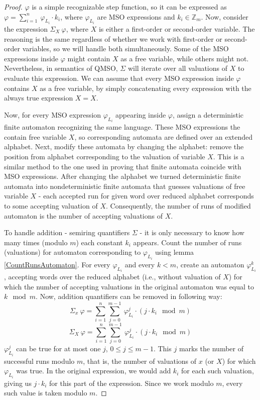 \documentclass[12pt]{article}
\theoremstyle{definition}
\begin{document}
\begin{proof}
    $\varphi$ is a simple recognizable step function, so it can be expressed as $\varphi = \sum_{i = 1}^{n} \ \varphi_{L_i} \cdot k_i$, where $\varphi_{L_i}$ are MSO expressions and $k_i \in \mathbb{Z}_m$. Now, consider the expression $\Sigma_{X} \ \varphi$, where $X$ is either a first-order or second-order variable. The reasoning is the same regardless of whether we work with first-order or second-order variables, so we will handle both simultaneously. Some of the MSO expressions inside $\varphi$ might contain $X$ as a free variable, while others might not. Nevertheless, in semantics of QMSO, $\Sigma$ will iterate over all valuations of $X$ to evaluate this expression. We can assume that every MSO expression inside $\varphi$ contains $X$ as a free variable, by simply concatenating every expression with the always true expression $X = X$.

    Now, for every MSO expression $\varphi_{L_i}$ appearing inside $\varphi$, assign a deterministic finite automaton recognizing the same language. These MSO expressions the contain free variable $X$, so corresponding automata are defined over an extended alphabet. Next, modify these automata by changing the alphabet: remove the position from alphabet corresponding to the valuation of variable $X$. This is a similar method to the one used in proving that finite automata coincide with MSO expressions. After changing the alphabet we turned deterministic finite automata into nondeterministic finite automata that guesses valuations of free variable $X$ - each accepted run for given word over reduced alphabet corresponds to some accepting valuation of $X$. Consequently, the number of runs of modified automaton is the number of accepting valuations of $X$.

    To handle addition - semiring quantifiers $\Sigma$ - it is only necessary to know how many times (modulo $m$) each constant $k_i$ appears. Count the number of runs (valuations) for automaton corresponding to $\varphi_{L_i}$ using lemma \ref{CountRunsAutomaton}. For every $\varphi_{L_i}$ and every $k < m$, create an automaton $\varphi_{L_i}^k$, accepting words over the reduced alphabet (i.e., without valuation of $X$) for which the number of accepting valuations in the original automaton was equal to $k \mod m$. Now, addition quantifiers can be removed in following way:
    $$\Sigma_x \ \varphi = \sum_{i = 1}^n \sum_{j = 0}^{m-1} \ \varphi_{L_i}^j \cdot (j \cdot k_i \mod m)$$
    $$\Sigma_X \ \varphi = \sum_{i = 1}^n \sum_{j = 0}^{m-1} \ \varphi_{L_i}^j \cdot (j \cdot k_i \mod m)$$
    $\varphi_{L_i}^j$ can be true for at most one $j$, $0 \leq j \leq m-1$. This $j$ marks the number of successful runs modulo $m$, that is, the number of valuations of $x$ (or $X$) for which $\varphi_{L_i}$ was true. In the original expression, we would add $k_i$ for each such valuation, giving us $j \cdot k_i$ for this part of the expression. Since we work modulo $m$, every such value is taken modulo $m$.
\end{proof}
\end{document}
